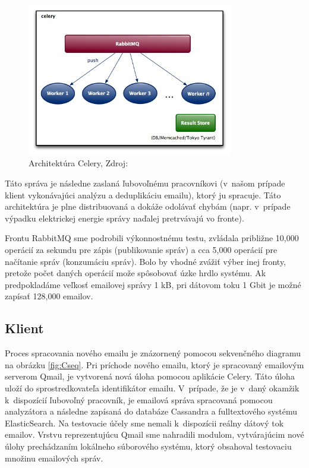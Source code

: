 \documentclass[11pt,twoside,a4paper]{book}
\begin{document}
\begin{figure}[h]
 \centering
 \includegraphics[width=9cm]{./figures/Celery.jpg}
 \caption{Architektúra Celery, Zdroj: \cite{celery}}
 \label{fig:Celery}
\end{figure}
Táto správa je následne zaslaná ľubovoľnému pracovníkovi (v~našom prípade klient vykonávajúci analýzu a deduplikáciu emailu), ktorý ju spracuje. Táto architektúra je plne distribuovaná a dokáže odolávať chybám (napr. v~prípade výpadku elektrickej energie správy naďalej pretrvávajú vo fronte).


Frontu RabbitMQ sme podrobili výkonnostnému testu, zvládala približne 10,000 operácií za sekundu pre zápis (publikovanie správ) a cca 5,000 operácií pre načítanie správ (konzumáciu správ). Bolo by vhodné zvážiť výber inej fronty, pretože počet daných operácií može spôsobovať úzke hrdlo systému. Ak predpokladáme veľkosť emailovej správy 1 kB, pri dátovom toku 1 Gbit je možné zapísať 128,000 emailov.

\subsection{Klient}

Proces spracovania nového emailu je znázornený pomocou sekvenčného diagramu na obrázku \ref{fig:Cseq}. Pri príchode nového emailu, ktorý je spracovaný emailovým serverom Qmail, je vytvorená nová úloha pomocou aplikácie Celery. Táto úloha uloží do sprostredkovateľa identifikátor emailu. V~prípade, že je v~daný okamžik k~dispozícií ľubovoľný pracovník, je emailová správa spracovaná pomocou analyzátora a následne zapísaná do databáze Cassandra a fulltextového systému ElasticSearch. Na testovacie účely sme nemali k~dispozícii reálny dátový tok emailov. Vrstvu reprezentujúcu Qmail sme nahradili modulom, vytvárajúcim nové úlohy prechádzaním lokálneho súborového systému, ktorý obsahoval testovaciu množinu emailových správ.
\end{document}
